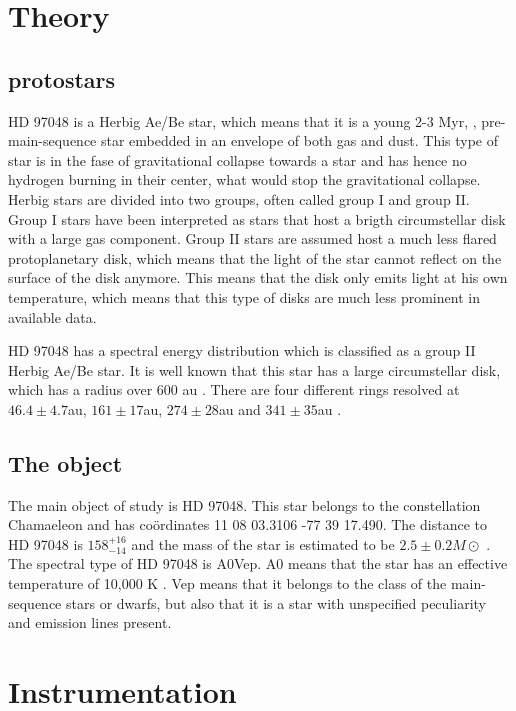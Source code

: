 \documentclass[twoside,single]{lion-msc}
\begin{document}
\chapter{Theory}
\section{protostars}
HD 97048 is a Herbig Ae/Be star, which means that it is a young 2-3 Myr, \cite{VanDenAncker1998}, pre-main-sequence star embedded in an envelope of both gas and dust. This type of star is in the fase of gravitational collapse towards a star and has hence no hydrogen burning in their center, what would stop the gravitational collapse. Herbig stars are divided into two groups, often called group I and group II. Group I stars have been interpreted as stars that host a brigth circumstellar disk with a large gas component. Group II stars are assumed host a much less flared protoplanetary disk, which means that the light of the star cannot reflect on the surface of the disk anymore. This means that the disk only emits light at his own temperature, which means that this type of disks are much less prominent in available data.
\bigskip 

HD 97048 has a spectral energy distribution which is classified as a group II Herbig Ae/Be star. It is well known that this star has a large circumstellar disk, which has a radius over 600 au \cite{Doering2007}. There are four different rings resolved at $46.4\pm 4.7$au, $161\pm 17$au,	$274\pm 28$au and $341\pm 35$au \cite{Ginski2016}.

\section{The object}
The main object of study is HD 97048. This star belongs to the constellation Chamaeleon and has co\"ordinates 11 08 03.3106 -77 39 17.490. The distance to HD 97048 is $158^{+16}_{-14}$  \cite{VanLeeuwen2007} and the mass of the star is estimated to be $2.5\pm 0.2 M\odot$ \cite{VanDenAncker1998}. The spectral type of HD 97048 is A0Vep. A0 means that the star has an effective temperature of 10,000 K \cite{Maaskant2013}. Vep means that it belongs to the class of the main-sequence stars or dwarfs, but also that it is a star with unspecified peculiarity and emission lines present.
\bigskip

\chapter{Instrumentation}
\end{document}
